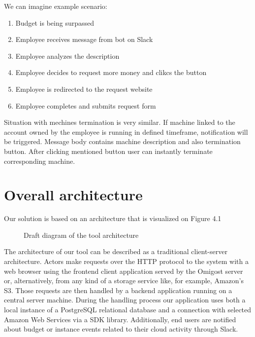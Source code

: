 \documentclass[licencjacka,en]{thesisclass}
\begin{document}
    \bigskip

    We can imagine example scenario:
    \begin{enumerate}
        \item Budget is being surpassed
        \item Employee receives message from bot on Slack
        \item Employee analyzes the description
        \item Employee decides to request more money and clikcs the button
        \item Employee is redirected to the request website
        \item Employee completes and submits request form
    \end{enumerate}

    \bigskip

    Situation with mechines termination is very similar. If machine linked to the account owned by the employee is running in defined timeframe, notification will be triggered. Message body contains machine description and also termination button. After clicking mentioned button user can instantly terminate corresponding machine.


    \section{Overall architecture}
    Our solution is based on an architecture that is visualized on Figure 4.1

    \begin{figure}[!htb]
      \caption{\label{fig:arch-diag} Draft diagram of the tool architecture}
    \end{figure}

    The architecture of our tool can be described as a traditional client-server architecture.
    Actors make requests over the HTTP protocol to the system with a web browser using the frontend client application
    served by the Omigost server or, alternatively, from any kind of a storage service like, for example, Amazon's S3.
    Those requests are then handled by a backend application running on a central server machine.
    During the handling process our application uses both a local instance of a PostgreSQL relational database
    and a connection with selected Amazon Web Services via a SDK library.
    Additionally, end users are notified about budget or instance events related to their cloud activity through Slack.
\end{document}
